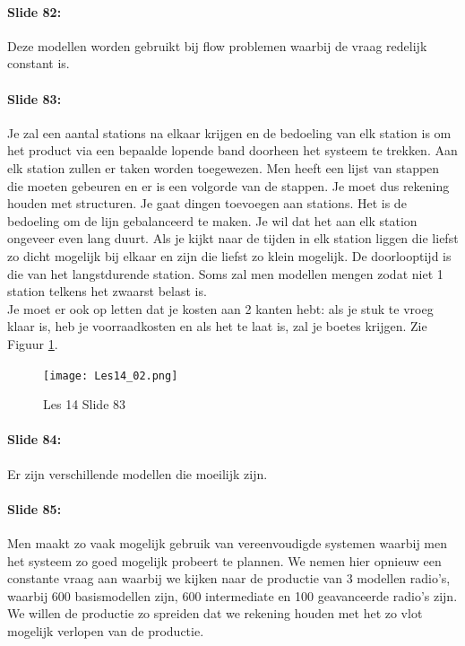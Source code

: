\documentclass[10pt,a4paper]{report}
\begin{document}
\paragraph{Slide 82:} Deze modellen worden gebruikt bij flow problemen waarbij de vraag redelijk constant is. 

\paragraph{Slide 83:} Je zal een aantal stations na elkaar krijgen en de bedoeling van elk station is om het product via een bepaalde lopende band doorheen het systeem te trekken. Aan elk station zullen er taken worden toegewezen. Men heeft een lijst van stappen die moeten gebeuren en er is een volgorde van de stappen. Je moet dus rekening houden met structuren. Je gaat dingen toevoegen aan stations. Het is de bedoeling om de lijn gebalanceerd te maken. Je wil dat het aan elk station ongeveer even lang duurt. Als je kijkt naar de tijden in elk station liggen die liefst zo dicht mogelijk bij elkaar en zijn die liefst zo klein mogelijk. De doorlooptijd is die van het langstdurende station. Soms zal men modellen mengen zodat niet 1 station telkens het zwaarst belast is. \\
Je moet er ook op letten dat je kosten aan 2 kanten hebt: als je stuk te vroeg klaar is, heb je voorraadkosten en als het te laat is, zal je boetes krijgen. Zie Figuur \ref{les14_02}.

\begin{figure}[h!]
\centering
\texttt{[image: Les14\_02.png]}
\caption{Les 14 Slide 83} 
\label{les14_02}
\end{figure}

\paragraph{Slide 84:} Er zijn verschillende modellen die moeilijk zijn.

\paragraph{Slide 85:} Men maakt zo vaak mogelijk gebruik van vereenvoudigde systemen waarbij men het systeem zo goed mogelijk probeert te plannen. We nemen hier opnieuw een constante vraag aan waarbij we kijken naar de productie van 3 modellen radio's, waarbij 600 basismodellen zijn, 600 intermediate en 100 geavanceerde radio's zijn. We willen de productie zo spreiden dat we rekening houden met het zo vlot mogelijk verlopen van de productie. 
\end{document}
